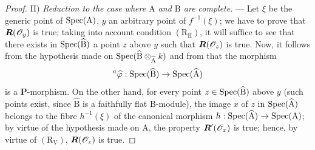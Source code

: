 \begin{proof}
II) \emph{Reduction to the case where $\mathrm{A}$ and $\mathrm{B}$ are complete.} --- Let $\xi$ be the generic point of $\operatorname{Spec}(\mathrm{A})$, $y$ an arbitrary point of $f^{-1}(\xi)$; we have to prove that $\boldsymbol{R}(\mathscr{O}_y)$ is true; taking into account condition $(\mathrm{R}_{\mathrm{II}})$, it will suffice to see that there exists in $\operatorname{Spec}(\widehat{\mathrm{B}})$ a point $z$ above $y$ such that $\boldsymbol{R}(\mathscr{O}_z)$ is true. Now, it follows from the hypothesis made on $\operatorname{Spec}(\widehat{\mathrm{B}}\otimes_{\widehat{\mathrm{A}}}k)$ and from  that the morphism
\[
  {}^a\widehat{\varphi}:\operatorname{Spec}(\widehat{\mathrm{B}})\to\operatorname{Spec}(\widehat{\mathrm{A}})
\]
is a $\boldsymbol{P}$-morphism. On the other hand, for every point $z\in\operatorname{Spec}(\widehat{\mathrm{B}})$ above $y$ (such points exist, since $\widehat{\mathrm{B}}$ is a faithfully flat $\mathrm{B}$-module), the image $x$ of $z$ in $\operatorname{Spec}(\widehat{\mathrm{A}})$ belongs to the fibre $h^{-1}(\xi)$ of the canonical morphism $h:\operatorname{Spec}(\widehat{\mathrm{A}})\to\operatorname{Spec}(\mathrm{A})$; by virtue of the hypothesis made on $\mathrm{A}$, the property $\boldsymbol{R}'(\mathscr{O}_x)$ is true; hence, by virtue of $(\mathrm{R}_{\mathrm{V}})$, $\boldsymbol{R}(\mathscr{O}_z)$ is true.
\end{proof}

